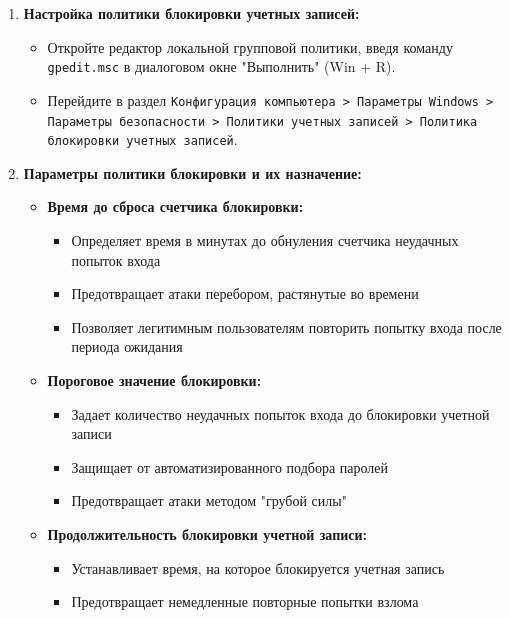 \documentclass[a4paper, 14pt]{report}
\begin{document}
\begin{enumerate}
    \item \textbf{Настройка политики блокировки учетных записей:}
          \begin{itemize}
              \item Откройте редактор локальной групповой политики, введя команду \texttt{gpedit.msc} в диалоговом окне "Выполнить" (Win + R).
              \item Перейдите в раздел \texttt{Конфигурация компьютера > Параметры Windows > Параметры безопасности > Политики учетных записей > Политика блокировки учетных записей}.
          \end{itemize}
    \item \textbf{Параметры политики блокировки и их назначение:}
          \begin{itemize}
              \item \textbf{Время до сброса счетчика блокировки:}
                    \begin{itemize}
                        \item Определяет время в минутах до обнуления счетчика неудачных попыток входа
                        \item Предотвращает атаки перебором, растянутые во времени
                        \item Позволяет легитимным пользователям повторить попытку входа после периода ожидания
                    \end{itemize}
              \item \textbf{Пороговое значение блокировки:}
                    \begin{itemize}
                        \item Задает количество неудачных попыток входа до блокировки учетной записи
                        \item Защищает от автоматизированного подбора паролей
                        \item Предотвращает атаки методом "грубой силы"
                    \end{itemize}
              \item \textbf{Продолжительность блокировки учетной записи:}
                    \begin{itemize}
                        \item Устанавливает время, на которое блокируется учетная запись
                        \item Предотвращает немедленные повторные попытки взлома

\end{itemize}
\end{itemize}
\end{enumerate}
\end{document}
